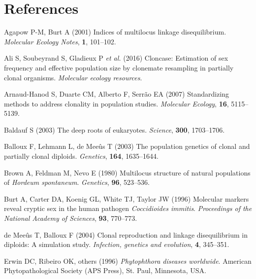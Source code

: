 \documentclass[double,12pt]{beavtex}
\begin{document}
  \chapter{References}\label{references}
  
  \noindent
  
  \setlength{\parindent}{-0.20in} \setlength{\leftskip}{0.20in}
  \setlength{\parskip}{8pt}
  
  \hypertarget{refs}{}
  \hypertarget{ref-Agapow_2001}{}
  Agapow P-M, Burt A (2001) Indices of multilocus linkage disequilibrium.
  \emph{Molecular Ecology Notes}, \textbf{1}, 101--102.
  
  \hypertarget{ref-ali2016cloncase}{}
  Ali S, Soubeyrand S, Gladieux P \emph{et al.} (2016) Cloncase:
  Estimation of sex frequency and effective population size by clonemate
  resampling in partially clonal organisms. \emph{Molecular ecology
  resources}.
  
  \hypertarget{ref-arnaud2007standardizing}{}
  Arnaud-Hanod S, Duarte CM, Alberto F, Serrão EA (2007) Standardizing
  methods to address clonality in population studies. \emph{Molecular
  Ecology}, \textbf{16}, 5115--5139.
  
  \hypertarget{ref-baldauf2003deep}{}
  Baldauf S (2003) The deep roots of eukaryotes. \emph{Science},
  \textbf{300}, 1703--1706.
  
  \hypertarget{ref-balloux2003population}{}
  Balloux F, Lehmann L, de Meeûs T (2003) The population genetics of
  clonal and partially clonal diploids. \emph{Genetics}, \textbf{164},
  1635--1644.
  
  \hypertarget{ref-brown1980multilocus}{}
  Brown A, Feldman M, Nevo E (1980) Multilocus structure of natural
  populations of \emph{Hordeum spontaneum}. \emph{Genetics}, \textbf{96},
  523--536.
  
  \hypertarget{ref-burt1996molecular}{}
  Burt A, Carter DA, Koenig GL, White TJ, Taylor JW (1996) Molecular
  markers reveal cryptic sex in the human pathogen \emph{Coccidioides
  immitis}. \emph{Proceedings of the National Academy of Sciences},
  \textbf{93}, 770--773.
  
  \hypertarget{ref-de2004clonal}{}
  de Meeûs T, Balloux F (2004) Clonal reproduction and linkage
  disequilibrium in diploids: A simulation study. \emph{Infection,
  genetics and evolution}, \textbf{4}, 345--351.
  
  \hypertarget{ref-erwin1996phytophthora}{}
  Erwin DC, Ribeiro OK, others (1996) \emph{Phytophthora diseases
  worldwide}. American Phytopathological Society (APS Press), St. Paul,
  Minnesota, USA.
  
\end{document}
